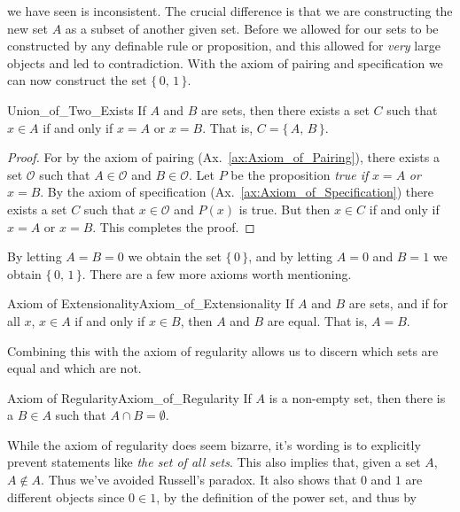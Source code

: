 \documentclass[crop=false,class=article]{standalone}                           %
\begin{document}
        we have seen is inconsistent. The crucial difference is that we are
        constructing the new set $A$ as a subset of another given set. Before
        we allowed for our sets to be constructed by any definable rule or
        proposition, and this allowed for \textit{very} large objects and led to
        contradiction. With the axiom of pairing and specification we can
        now construct the set $\{\,0,\,1\,\}$.
        \begin{ltheorem}{}{Union_of_Two_Exists}
            If $A$ and $B$ are sets, then there exists a set $C$ such that
            $x\in{A}$ if and only if $x=A$ or $x=B$. That is,
            $C=\{\,A,\,B\,\}$.
        \end{ltheorem}
        \begin{proof}
            For by the axiom of pairing (Ax.~\ref{ax:Axiom_of_Pairing}), there
            exists a set $\mathcal{O}$ such that $A\in\mathcal{O}$ and
            $B\in\mathcal{O}$. Let $P$ be the proposition
            \textit{true if} $x=A$ \textit{or} $x=B$. By the axiom of
            specification (Ax.~\ref{ax:Axiom_of_Specification}) there exists a
            set $C$ such that $x\in\mathcal{O}$ and $P(x)$ is true. But then
            $x\in{C}$ if and only if $x=A$ or $x=B$. This completes the proof.
        \end{proof}
        By letting $A=B=0$ we obtain the set $\{\,0\,\}$, and by letting
        $A=0$ and $B=1$ we obtain $\{\,0,\,1\,\}$. There are a few more axioms
        worth mentioning.
        \begin{faxiom}{Axiom of Extensionality}{Axiom_of_Extensionality}
            If $A$ and $B$ are sets, and if for all $x$, $x\in{A}$ if and only
            if $x\in{B}$, then $A$ and $B$ are equal. That is, $A=B$.
        \end{faxiom}
        Combining this with the axiom of regularity allows us to discern which
        sets are equal and which are not.
        \begin{faxiom}{Axiom of Regularity}{Axiom_of_Regularity}
            If $A$ is a non-empty set, then there is a $B\in{A}$ such that
            $A\cap{B}=\emptyset$.
        \end{faxiom}
        While the axiom of regularity does seem bizarre, it's wording is to
        explicitly prevent statements like \textit{the set of all sets}. This
        also implies that, given a set $A$, $A\notin{A}$. Thus we've avoided
        Russell's paradox. It also shows that $0$ and $1$ are different objects
        since $0\in{1}$, by the definition of the power set, and thus by
\end{document}
